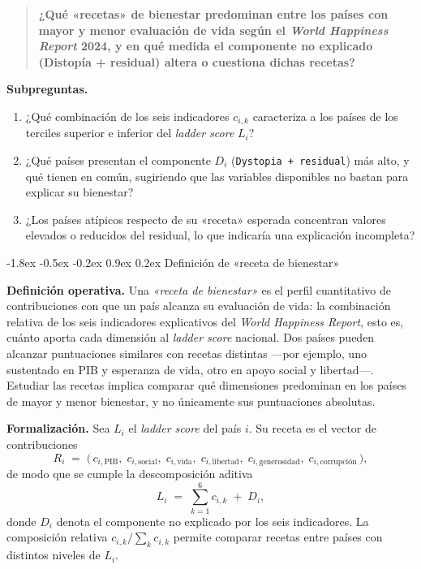 \documentclass[11pt,a4paper]{article}
\makeatletter
\renewcommand\section{\@startsection{section}{1}{\z@}%
  {-1.8ex \@plus -0.5ex \@minus -0.2ex}%
  {0.9ex \@plus0.2ex}%
  {\normalfont\large\bfseries}}
\makeatother
\begin{document}
\begin{quote}
\textbf{¿Qué «recetas» de bienestar predominan entre los países con mayor y menor
evaluación de vida según el \emph{World Happiness Report} 2024, y en qué medida el
componente no explicado (Distopía + residual) altera o cuestiona dichas recetas?}
\end{quote}

\textbf{Subpreguntas.}
\begin{enumerate}[leftmargin=1.6em, itemsep=0.25em]
  \item ¿Qué combinación de los seis indicadores $c_{i,k}$ caracteriza a los
        países de los terciles superior e inferior del \emph{ladder score} $L_i$?
  \item ¿Qué países presentan el componente $D_i$ (\texttt{Dystopia + residual})
        más alto, y qué tienen en común, sugiriendo que las variables disponibles
        no bastan para explicar su bienestar?
  \item ¿Los países atípicos respecto de su «receta» esperada concentran valores
        elevados o reducidos del residual, lo que indicaría una explicación
        incompleta?
\end{enumerate}

\section{Definición de «receta de bienestar»}

\textbf{Definición operativa.} Una \emph{«receta de bienestar»} es el perfil
cuantitativo de contribuciones con que un país alcanza su evaluación de vida: la
combinación relativa de los seis indicadores explicativos del \emph{World Happiness
Report}, esto es, cuánto aporta cada dimensión al \emph{ladder score} nacional.
Dos países pueden alcanzar puntuaciones similares con recetas distintas ---por
ejemplo, uno sustentado en PIB y esperanza de vida, otro en apoyo social y
libertad---. Estudiar las recetas implica comparar qué dimensiones predominan en
los países de mayor y menor bienestar, y no únicamente sus puntuaciones absolutas.

\textbf{Formalización.} Sea $L_i$ el \emph{ladder score} del país $i$. Su receta
es el vector de contribuciones
\begin{equation}
  R_i \;=\; \bigl(\, c_{i,\text{PIB}},\; c_{i,\text{social}},\;
  c_{i,\text{vida}},\; c_{i,\text{libertad}},\; c_{i,\text{generosidad}},\;
  c_{i,\text{corrupción}} \,\bigr),
\end{equation}
de modo que se cumple la descomposición aditiva
\begin{equation}
  L_i \;=\; \sum_{k=1}^{6} c_{i,k} \;+\; D_i,
  \label{eq:descomposicion}
\end{equation}
donde $D_i$ denota el componente no explicado por los seis indicadores. La
composición relativa $c_{i,k}\big/\sum_{k} c_{i,k}$ permite comparar recetas entre
países con distintos niveles de $L_i$.
\end{document}

